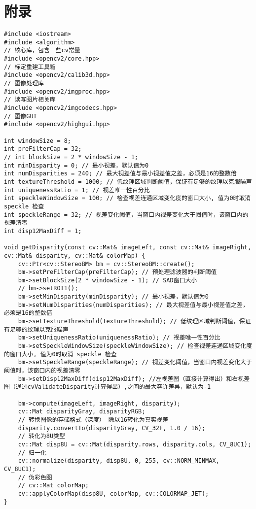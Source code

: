 \documentclass[10.5pt, a4paper]{article}
\begin{document}
\section*{附录}
\begin{lstlisting}
#include <iostream>
#include <algorithm>
// 核心库，包含一些cv常量
#include <opencv2/core.hpp>
// 标定重建工具箱
#include <opencv2/calib3d.hpp>
// 图像处理库
#include <opencv2/imgproc.hpp>
// 读写图片相关库
#include <opencv2/imgcodecs.hpp>
// 图像GUI
#include <opencv2/highgui.hpp>

int windowSize = 8; 
int preFilterCap = 32;
// int blockSize = 2 * windowSize - 1;
int minDisparity = 0; // 最小视差，默认值为0
int numDisparities = 240; // 最大视差值与最小视差值之差，必须是16的整数倍
int textureThreshold = 1000; // 低纹理区域判断阈值，保证有足够的纹理以克服噪声 
int uniquenessRatio = 1; // 视差唯一性百分比
int speckleWindowSize = 100; // 检查视差连通区域变化度的窗口大小, 值为0时取消 speckle 检查  
int speckleRange = 32; // 视差变化阈值，当窗口内视差变化大于阈值时，该窗口内的视差清零  
int disp12MaxDiff = 1;                                                                   

void getDisparity(const cv::Mat& imageLeft, const cv::Mat& imageRight, cv::Mat& disparity, cv::Mat& colorMap) {
    cv::Ptr<cv::StereoBM> bm = cv::StereoBM::create();
    bm->setPreFilterCap(preFilterCap); // 预处理滤波器的判断阈值
    bm->setBlockSize(2 * windowSize - 1); // SAD窗口大小
    // bm->setROI1();
    bm->setMinDisparity(minDisparity); // 最小视差，默认值为0
    bm->setNumDisparities(numDisparities); // 最大视差值与最小视差值之差，必须是16的整数倍
    bm->setTextureThreshold(textureThreshold); // 低纹理区域判断阈值，保证有足够的纹理以克服噪声 
    bm->setUniquenessRatio(uniquenessRatio); // 视差唯一性百分比
    bm->setSpeckleWindowSize(speckleWindowSize); // 检查视差连通区域变化度的窗口大小, 值为0时取消 speckle 检查  
    bm->setSpeckleRange(speckleRange); // 视差变化阈值，当窗口内视差变化大于阈值时，该窗口内的视差清零  
    bm->setDisp12MaxDiff(disp12MaxDiff); //左视差图（直接计算得出）和右视差图（通过cvValidateDisparity计算得出）,之间的最大容许差异，默认为-1 

    bm->compute(imageLeft, imageRight, disparity);
    cv::Mat disparityGray, disparityRGB;
    // 转换图像的存储格式（深度） 除以16转化为真实视差
    disparity.convertTo(disparityGray, CV_32F, 1.0 / 16);
    // 转化为8U类型
    cv::Mat disp8U = cv::Mat(disparity.rows, disparity.cols, CV_8UC1);
    // 归一化
    cv::normalize(disparity, disp8U, 0, 255, cv::NORM_MINMAX, CV_8UC1);
    // 伪彩色图
    // cv::Mat colorMap;
    cv::applyColorMap(disp8U, colorMap, cv::COLORMAP_JET);
}


\end{lstlisting}
\end{document}
